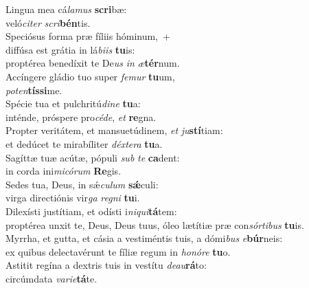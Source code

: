 \evenverse Lingua mea cá\textit{la}\textit{mus} \textbf{scri}bæ:~\*\\
\evenverse veló\textit{ci}\textit{ter} \textit{scri}\textbf{bén}tis.\\
\oddverse Speciósus forma præ fíliis hóminum,~+\\
\oddverse  diffúsa est grátia in lá\textit{bi}\textit{is} \textbf{tu}is:~\*\\
\oddverse proptérea benedíxit te De\textit{us} \textit{in} \textit{æ}\textbf{tér}num.\\
\evenverse Accíngere gládio tuo super \textit{fe}\textit{mur} \textbf{tu}um,~\*\\
\evenverse \textit{po}\textit{ten}\textbf{tís}\textbf{si}me.\\
\oddverse Spécie tua et pulchritú\textit{di}\textit{ne} \textbf{tu}a:~\*\\
\oddverse inténde, próspere pro\textit{cé}\textit{de}, \textit{et} \textbf{re}gna.\\
\evenverse Propter veritátem, et mansuetúdinem, \textit{et} \textit{ju}\textbf{stí}tiam:~\*\\
\evenverse et dedúcet te mirabíliter \textit{déx}\textit{te}\textit{ra} \textbf{tu}a.\\
\oddverse Sagíttæ tuæ acútæ, pópuli \textit{sub} \textit{te} \textbf{ca}dent:~\*\\
\oddverse in corda ini\textit{mi}\textit{có}\textit{rum} \textbf{Re}gis.\\
\evenverse Sedes tua, Deus, in sǽ\textit{cu}\textit{lum} \textbf{sǽ}culi:~\*\\
\evenverse virga directiónis vir\textit{ga} \textit{re}\textit{gni} \textbf{tu}i.\\
\oddverse Dilexísti justítiam, et odísti i\textit{ni}\textit{qui}\textbf{tá}tem:~\*\\
\oddverse proptérea unxit te, Deus, Deus tuus, óleo lætítiæ præ con\textit{sór}\textit{ti}\textit{bus} \textbf{tu}is.\\
\evenverse Myrrha, et gutta, et cásia a vestiméntis tuis, a dómi\textit{bus} \textit{e}\textbf{búr}neis:~\*\\
\evenverse ex quibus delectavérunt te fíliæ regum in \textit{ho}\textit{nó}\textit{re} \textbf{tu}o.\\
\oddverse Astitit regína a dextris tuis in vestítu \textit{de}\textit{au}\textbf{rá}to:~\*\\
\oddverse circúmdata \textit{va}\textit{ri}\textit{e}\textbf{tá}te.\\
